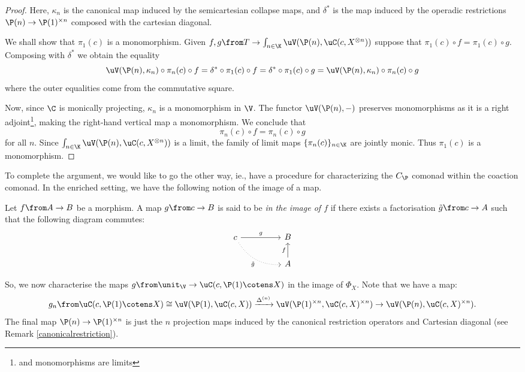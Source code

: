 \documentclass{tac}
\begin{document}
\begin{proof}
Here, $\kappa_n$ is the canonical map induced by the semicartesian collapse maps, and $\delta^*$ is the map induced by the operadic restrictions $\P(n) \to \P(1)^{\times n}$ composed with the cartesian diagonal. 

We shall show that $\pi_1(c)$ is a monomorphism. Given $f,g \from T \to \int_{n \in \K} \uV(\P(n), \uC(c, X^{\otimes n}))$ suppose that $\pi_1(c) \circ f= \pi_1(c) \circ g.$ Composing with $\delta^\ast$ we obtain the equality
$$
\uV(\P(n), \kappa_n) \circ \pi_n(c) \circ f=\delta^\ast \circ \pi_1(c) \circ f= \delta^\ast \circ \pi_1(c) \circ g = \uV(\P(n), \kappa_n) \circ \pi_n(c) \circ g $$
where the outer equalities come from the commutative square.

Now, since $\C$ is monically projecting, $\kappa_n$ is a monomorphism in $\V$. The functor $\uV(\P(n), -)$ preserves monomorphisms as it is a right adjoint\footnote{and monomorphisms are limits}, making the right-hand vertical map a monomorphism. We conclude that 
$$
\pi_n(c) \circ f  =   \pi_n(c)\circ g
$$
for all $n.$ Since  
$
\int_{n \in \K} \uV(\P(n), \uC(c, X^{\otimes n}))  
$
is a limit, the family of limit maps $\{\pi_n(c)\}_{n\in \K}$ are jointly monic.  Thus $\pi_1(c)$ is a monomorphism.
\end{proof}
To complete the argument, we would like to go the other way, ie., have a procedure for characterizing the $C_{\P}$ comonad within the coaction comonad. In the enriched setting, we have the following notion of the image of a map.
\begin{definition}
Let $f\from A \to B$ be a morphism. A map $g \from c \to B$ is said to be \emph{in the image of $f$} if there exists a factorisation $\tilde{g}\from c \to A$ such that the following diagram commutes:
$$
\begin{tikzcd}
    c \arrow[drr, dotted, bend right, "\tilde{g}", swap] \arrow[rr, "g"] && B 
    \\
    \ && A \arrow[u, "f"]
\end{tikzcd}
$$ 
\end{definition}
 So, we now characterise the maps $g \from \unit_{\V} \to \uC(c, \P(1) \cotens X)$ in the image of $\Phi_X.$ Note that we have a map:
$$
 g_n \from \uC(c, \P(1)\cotens X) \cong  \uV(\P(1), \uC(c, X)) \xrightarrow{\Delta^{(n)}}  \uV(\P(1)^{\times n}, \uC(c, X)^{\times n}) \to \uV(\P(n), \uC(c, X)^{\times n}).
$$
The final map $\P(n) \to \P(1)^{\times n}$ is just the $n$ projection maps induced by the canonical restriction operators and Cartesian diagonal (see Remark \ref{canonicalrestriction}).
\end{document}
